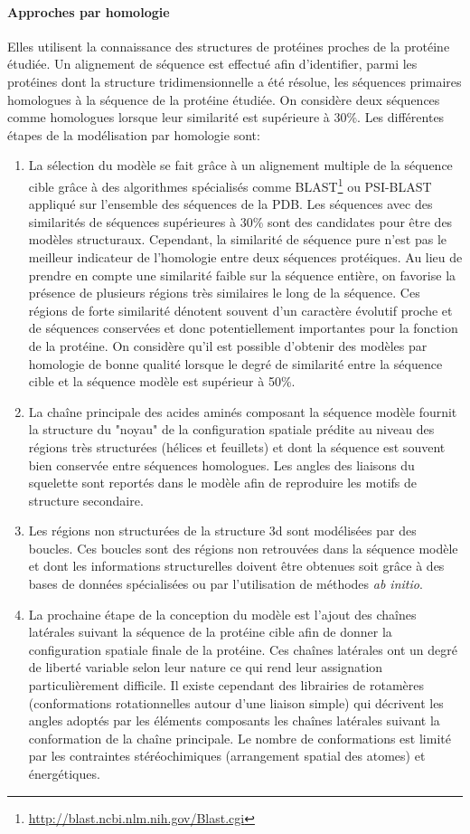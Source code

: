 \paragraph{Approches par homologie} 
Elles utilisent la connaissance des structures de protéines proches de la protéine étudiée. Un alignement de séquence est effectué afin d'identifier, parmi les protéines dont la structure tridimensionnelle a été résolue, les séquences primaires homologues à la séquence de la protéine étudiée. On considère deux séquences comme homologues lorsque leur similarité est supérieure à 30\%. Les différentes étapes de la modélisation par homologie sont:
\begin{enumerate}
	\item La sélection du modèle se fait grâce à un alignement multiple de la séquence cible grâce à des algorithmes spécialisés comme BLAST\footnote{\url{http://blast.ncbi.nlm.nih.gov/Blast.cgi}} ou PSI-BLAST appliqué sur l'ensemble des séquences de la PDB. Les séquences avec des similarités de séquences supérieures à 30\% sont des candidates pour être des modèles structuraux. Cependant, la similarité de séquence pure n'est pas le meilleur indicateur de l'homologie entre deux séquences protéiques. Au lieu de prendre en compte une similarité faible sur la séquence entière, on favorise la présence de plusieurs régions très similaires le long de la séquence. Ces régions de forte similarité dénotent souvent d'un caractère évolutif proche et de séquences conservées et donc potentiellement importantes pour la fonction de la protéine. On considère qu'il est possible d'obtenir des modèles par homologie de bonne qualité lorsque le degré de similarité entre la séquence cible et la séquence modèle est supérieur à 50\%.
	\item La chaîne principale des acides aminés composant la séquence modèle fournit la structure du "noyau" de la configuration spatiale prédite au niveau des régions très structurées (hélices et feuillets) et dont la séquence est souvent bien conservée entre séquences homologues. Les angles des liaisons du squelette sont reportés dans le modèle afin de reproduire les motifs de structure secondaire.
	\item Les régions non structurées de la structure 3d sont modélisées par des boucles. Ces boucles sont des régions non retrouvées dans la séquence modèle et dont les informations structurelles doivent être obtenues soit grâce à des bases de données spécialisées ou par l'utilisation de méthodes \textit{ab initio}.
	\item La prochaine étape de la conception du modèle est l'ajout des chaînes latérales suivant la séquence de la protéine cible afin de donner la configuration spatiale finale de la protéine. Ces chaînes latérales ont un degré de liberté variable selon leur nature ce qui rend leur assignation particulièrement difficile. Il existe cependant des librairies de rotamères (conformations rotationnelles autour d'une liaison simple) qui décrivent les angles adoptés par les éléments composants les chaînes latérales suivant la conformation de la chaîne principale. Le nombre de conformations est limité par les contraintes stéréochimiques (arrangement spatial des atomes) et énergétiques.

\end{enumerate}
